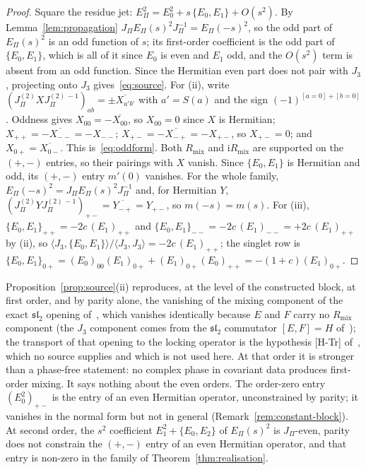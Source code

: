 \documentclass[11pt]{article}
\theoremstyle{definition}
\theoremstyle{remark}
\newcommand{\JPi}{J_{\Pi}}
\newcommand{\Jthree}{J_{3}}
\newcommand{\Rmix}{R_{\mathrm{mix}}}
\newcommand{\Epi}{E_{\Pi}}
\begin{document}
    \begin{proof}
      Square the residue jet: $\Epi^2 = E_0^2 + s\,\{E_0, E_1\} + O(s^2)$.
      By Lemma~\ref{lem:propagation} $\JPi \Epi(s)^2 \JPi^{-1} = \Epi(-s)^2$, so the odd part of $\Epi(s)^2$ is an odd
      function of $s$; its first-order coefficient is the odd part of $\{E_0, E_1\}$, which is all of it since $E_0$ is
      even and $E_1$ odd, and the $O(s^2)$ term is absent from an odd function.
      Since the Hermitian even part does not pair with $\Jthree$, projecting onto $\Jthree$ gives~\eqref{eq:source}.
      For (ii), write $(\JPi^{(2)} X \JPi^{(2)\,-1})_{ab} = \pm \overline{X_{a'b'}}$ with $a' = S(a)$ and the sign
      $(-1)^{[a = 0] + [b = 0]}$.
      Oddness gives $X_{00} = -\overline{X_{00}}$, so $X_{00} = 0$ since $X$ is Hermitian; $X_{++} = -\overline{X_{--}}
      = -X_{--}$; $X_{+-} = -\overline{X_{-+}} = -X_{+-}$, so $X_{+-} = 0$; and $X_{0+} = \overline{X_{0-}}$.
      This is~\eqref{eq:oddform}.
      Both $\Rmix$ and $\mathrm{i}\Rmix$ are supported on the $(+,-)$ entries, so their pairings with $X$ vanish.
      Since $\{E_0, E_1\}$ is Hermitian and odd, its $(+,-)$ entry $m'(0)$ vanishes.
      For the whole family, $\Epi(-s)^2 = \JPi \Epi(s)^2 \JPi^{-1}$ and, for Hermitian $Y$,
      $(\JPi^{(2)} Y \JPi^{(2)\,-1})_{+-} = \overline{Y_{-+}} = Y_{+-}$, so $m(-s) = m(s)$.
      For (iii), $\{E_0, E_1\}_{++} = -2c\,(E_1)_{++}$ and $\{E_0, E_1\}_{--} = -2c\,(E_1)_{--} = +2c\,(E_1)_{++}$ by
      (ii), so $\langle \Jthree, \{E_0, E_1\}\rangle / \langle \Jthree, \Jthree\rangle = -2c\,(E_1)_{++}$; the singlet
      row is $\{E_0, E_1\}_{0+} = (E_0)_{00}(E_1)_{0+} + (E_1)_{0+}(E_0)_{++} = -(1+c)(E_1)_{0+}$.
    \end{proof}

    Proposition~\ref{prop:source}(ii) reproduces, at the level of the constructed block, at first order, and by parity
    alone, the vanishing of the mixing component of the exact $\mathfrak{sl}_2$ opening of~\cite{Beau2026prs}, which
    vanishes identically because $E$ and $F$ carry no $R_{\mathrm{mix}}$ component (the $J_3$ component comes from the
    $\mathfrak{sl}_2$ commutator $[E,F]=H$ of~\cite{Beau2026q14}); the transport of that opening to the locking
    operator is the hypothesis [H-Tr] of~\cite{Beau2026prs}, which no source supplies and which is not used here.
    At that order it is stronger than a phase-free statement: no complex phase in covariant data produces first-order
    mixing.
    It says nothing about the even orders.
    The order-zero entry $(E_0^2)_{+-}$ is the entry of an even Hermitian operator, unconstrained by parity; it
    vanishes in the normal form but not in general (Remark~\ref{rem:constant-block}).
    At second order, the $s^2$ coefficient $E_1^2 + \{E_0, E_2\}$ of $\Epi(s)^2$ is $\JPi$-even,
    parity does not constrain the $(+,-)$ entry of an even Hermitian operator, and that entry is non-zero in the family
    of Theorem~\ref{thm:realisation}.
\end{document}
